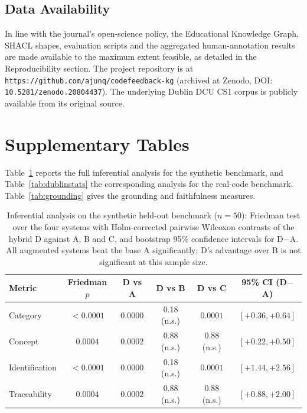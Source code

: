 \documentclass[sageh]{sagej}
\begin{document}
\subsection*{Data Availability}
In line with the journal's open-science policy, the Educational Knowledge Graph, SHACL shapes, evaluation scripts and the aggregated human-annotation results are made available to the maximum extent feasible, as detailed in the Reproducibility section. The project repository is at \texttt{https://github.com/ajunq/codefeedback-kg} (archived at Zenodo, DOI: \texttt{10.5281/zenodo.20804437}). The underlying Dublin DCU CS1 corpus is publicly available from its original source.

\appendix

\section{Supplementary Tables}\label{app:tables}
Table~\ref{tab:stats} reports the full inferential analysis for the synthetic benchmark, and Table~\ref{tab:dublinstats} the corresponding analysis for the real-code benchmark. Table~\ref{tab:grounding} gives the grounding and faithfulness measures.

\begin{table}[h]
\centering
\caption{Inferential analysis on the synthetic held-out benchmark ($n=50$): Friedman test over the four systems with Holm-corrected pairwise Wilcoxon contrasts of the hybrid D against A, B and C, and bootstrap 95\% confidence intervals for D$-$A. All augmented systems beat the base A significantly; D's advantage over B is not significant at this sample size.\label{tab:stats}}
\begin{tabular}{@{}lccccc@{}}
\toprule
Metric & Friedman $p$ & D vs A & D vs B & D vs C & 95\% CI (D$-$A) \\
\midrule
Category       & $<0.0001$ & $0.0000$ & 0.18 (n.s.) & $0.0001$ & $[+0.36,+0.64]$ \\
Concept        & $0.0004$  & $0.0002$ & 0.88 (n.s.) & 0.88 (n.s.) & $[+0.22,+0.50]$ \\
Identification & $<0.0001$ & $0.0000$ & 0.18 (n.s.) & $0.0001$ & $[+1.44,+2.56]$ \\
Traceability   & $0.0004$  & $0.0002$ & 0.88 (n.s.) & 0.88 (n.s.) & $[+0.88,+2.00]$ \\
\bottomrule
\end{tabular}
\end{table}
\end{document}
